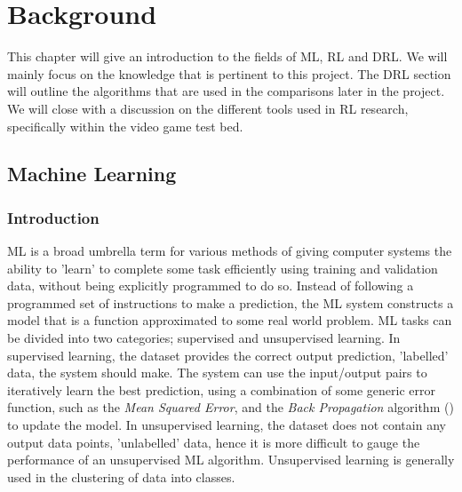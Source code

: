 
\chapter{Background}
This chapter will give an introduction to the fields of ML, RL and DRL. We will mainly focus on the knowledge that is pertinent to this project. The DRL section will outline the algorithms that are used in the comparisons later in the project. We will close with a discussion on the different tools used in RL research, specifically within the video game test bed.

\section{Machine Learning}
\subsection{Introduction}
ML is a broad umbrella term for various methods of giving computer systems the ability to 'learn' to
complete some task efficiently using training and validation data, without being explicitly
programmed to do so. Instead of following a programmed set of instructions to make a prediction, the
ML system constructs a model that is a function approximated to some real world problem. ML tasks
can be divided into two categories; supervised and unsupervised learning. In supervised learning,
the dataset provides the correct output prediction, 'labelled' data, the system should make. The
system can use the input/output pairs to iteratively learn the best prediction, using a combination
of some generic error function, such as the \textit{Mean Squared Error}, and the \textit{Back Propagation} algorithm (\cite{chauvin-bp}) to update the model. In unsupervised learning, the dataset
does not contain any output data points, 'unlabelled' data, hence it is more difficult to gauge the
performance of an unsupervised ML algorithm. Unsupervised learning is generally used in the
clustering of data into classes. \paragraph{}

